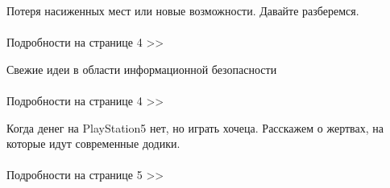 \documentclass{article}
\begin{document}
\begin{multicols}{3}

Потеря насиженных мест или новые возможности. Давайте разберемся.
\\\\Подробности на странице 4 >>
\closearticle

Свежие идеи в области информационной безопасности
\\\\Подробности на странице 4 >>
\vspace{5mm}
\closearticle

Когда денег на PlayStation5 нет, но играть хочеца. Расскажем о жертвах, на которые идут современные додики.
\\\\Подробности на странице 5 >>
\closearticle

\end{multicols}
\end{document}
